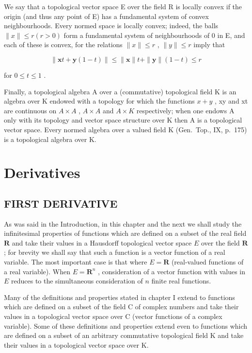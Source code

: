 We say that a topological vector space E over the field R is locally convex if the origin (and thus any point of E) has a fundamental system of convex neighbourhoods. Every normed space is locally convex; indeed, the balls \(\|x\| \leqslant r (r > 0)\) form a fundamental system of neighbourhoods of 0 in E, and each of these is convex, for the relations \(\|x\| \leqslant r\) , \(\|y\| \leqslant r\) imply that

\[
\| \mathbf {x} t + \mathbf {y} (1 - t) \| \leqslant \| \mathbf {x} \| t + \| \mathbf {y} \| (1 - t) \leqslant r
\]

for \(0 \leqslant t \leqslant 1\) .

Finally, a topological algebra A over a (commutative) topological field K is an algebra over K endowed with a topology for which the functions \(x + y\) , xy and xt are continuous on \(A \times A\) , \(A \times A\) and \(A \times K\) respectively; when one endows A only with its topology and vector space structure over K then A is a topological vector space. Every normed algebra over a valued field K (Gen.~Top., IX, p.~175) is a topological algebra over K.

\chapter{Derivatives}

\section{FIRST DERIVATIVE}

As was said in the Introduction, in this chapter and the next we shall study the infinitesimal properties of functions which are defined on a subset of the real field \(\mathbf{R}\) and take their values in a Hausdorff topological vector space \(E\) over the field \(\mathbf{R}\) ; for brevity we shall say that such a function is a vector function of a real variable. The most important case is that where \(E = \mathbf{R}\) (real-valued functions of a real variable). When \(E = \mathbf{R}^n\) , consideration of a vector function with values in \(E\) reduces to the simultaneous consideration of \(n\) finite real functions.

Many of the definitions and properties stated in chapter I extend to functions which are defined on a subset of the field C of complex numbers and take their values in a topological vector space over C (vector functions of a complex variable). Some of these definitions and properties extend even to functions which are defined on a subset of an arbitrary commutative topological field K and take their values in a topological vector space over K.


